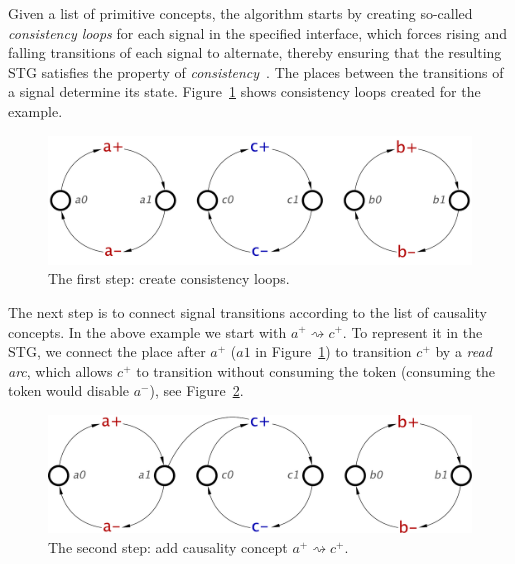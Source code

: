 \documentclass[british, journal]{IEEEtran}
\begin{document}
Given a list of primitive concepts, the algorithm starts by creating so-called
\emph{consistency loops} for each signal in the specified interface, which forces rising
and falling transitions of each signal to alternate, thereby ensuring that the resulting
STG satisfies the property of \emph{consistency}~\cite{Cortadella}.
The places between the transitions of a signal determine its state.
Figure~\ref{fig:step-by-step1} shows consistency loops created for the example.
\vspace{-2mm}
\begin{figure}[h]
\begin{centering}
\includegraphics[scale=0.3]{Images/Step-by-step1}
\par
\protect\caption{\label{fig:step-by-step1}The first step: create consistency loops.}
\vspace{-2mm}
\end{centering}
\end{figure}

The next step is to connect signal transitions according to the list of causality
concepts. In the above example we start with $a^{+}\rightsquigarrow c^{+}$.
To represent it in the STG, we connect the place after $a^{+}$ ($a1$ in
Figure~\ref{fig:step-by-step1}) to transition $c^{+}$ by a \emph{read arc},
which allows $c^{+}$ to transition without consuming the token (consuming
the token would disable $a^{-}$), see Figure~\ref{fig:step-by-step2}.

\vspace{-2mm}
\begin{figure}[h]
\begin{centering}
\includegraphics[scale=0.3]{Images/Step-by-step2}
\par
\protect\caption{\label{fig:step-by-step2}The second step: add causality concept $a^{+}\rightsquigarrow c^{+}$.}
\vspace{-2mm}
\end{centering}
\end{figure}
\end{document}
